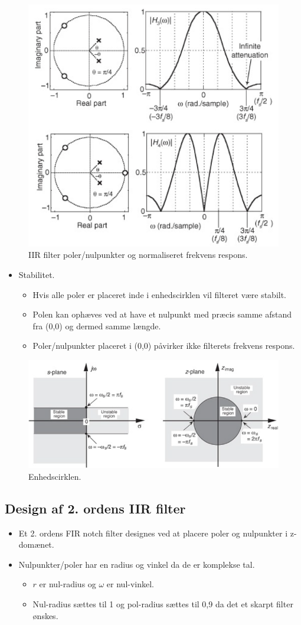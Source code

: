 \documentclass[danish]{article}
\begin{document}
\begin{figure}[H]
	\centering
	\includegraphics[width=0.4\linewidth]{graphics/iir_pz2}
	\caption{IIR filter poler/nulpunkter og normaliseret frekvens respons.}
	\label{fig:iir_pz2}
\end{figure}

\begin{itemize}
	\item Stabilitet.
	\begin{itemize}
		\item Hvis alle poler er placeret inde i enhedscirklen vil filteret være stabilt.
		\item Polen kan ophæves ved at have et nulpunkt med præcis samme afstand fra (0,0) og dermed samme længde.
		\item Poler/nulpunkter placeret i (0,0) påvirker ikke filterets frekvens respons. 
	\end{itemize}
\end{itemize}

\begin{figure}[H]
	\centering
	\includegraphics[width=0.8\linewidth]{graphics/unitycircle}
	\caption{Enhedscirklen.}
	\label{fig:unitycircle}
\end{figure}

\subsection{Design af 2. ordens IIR filter}
\begin{itemize}
	\item Et 2. ordens FIR notch filter designes ved at placere poler og nulpunkter i z-domænet.
	\item Nulpunkter/poler har en radius og vinkel da de er komplekse tal.
	\begin{itemize}
		\item $r$ er nul-radius og $\omega$ er nul-vinkel.
		\item Nul-radius sættes til 1 og pol-radius sættes til 0,9 da det et skarpt filter ønskes.
	\end{itemize}
\end{itemize}
\end{document}
